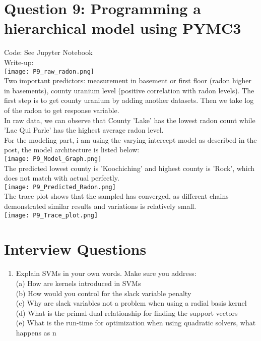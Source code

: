 \documentclass{article}
\begin{document}
\begin{enumerate}
\section{Question 9: Programming a hierarchical model using PYMC3}

Code: See Jupyter Notebook \\
Write-up: \\
\texttt{[image: P9\_raw\_radon.png]}\\
Two important predictors: measurement in basement or first floor (radon higher in basements), county uranium level (positive correlation with radon levels). The first step is to get county uranium by adding another datasets. Then we take log of the radon to get response variable. \\
In raw data, we can observe that County 'Lake' has the lowest radon count while 'Lac Qui Parle' has the highest average radon level. \\
For the modeling part, i am using the varying-intercept model as described in the post, the model architecture is listed below: \\
\texttt{[image: P9\_Model\_Graph.png]}\\
The predicted lowest county is 'Koochiching' and highest county is 'Rock', which does not match with actual perfectly.\\
\texttt{[image: P9\_Predicted\_Radon.png]}\\
The trace plot shows that the sampled has converged, as different chains demonstrated similar results and variations is relatively small.  \\
\texttt{[image: P9\_Trace\_plot.png]}\\

\section{Interview Questions}

\begin{enumerate}
\item Explain SVMs in your own words. Make sure you address: \\
(a) How are kernels introduced in SVMs \\
(b) How would you control for the slack variable penalty \\
(c) Why are slack variables not a problem when using a radial basis kernel  \\
(d) What is the primal-dual relationship for finding the support vectors \\
(e) What is the run-time for optimization when using quadratic solvers, what happens as n \\


\end{enumerate}
\end{enumerate}
\end{document}

